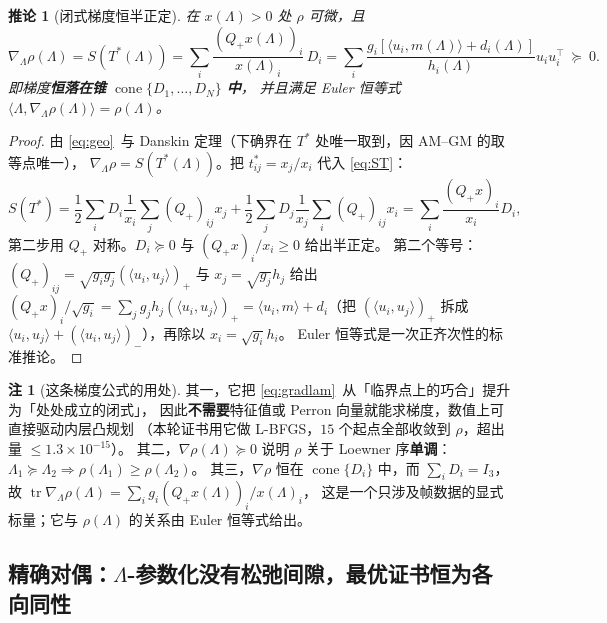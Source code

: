 \documentclass[UTF8,11pt]{ctexart}
\newtheorem{corollary}[theorem]{推论}
\theoremstyle{definition}
\newtheorem{remark}[theorem]{注}
\newcommand{\Lam}{\Lambda}
\newcommand{\tr}{\operatorname{tr}}
\begin{document}
\begin{corollary}[闭式梯度恒半正定]\label{cor:gradpsi}
在 $x(\Lam)>0$ 处 $\rho$ 可微，且
\begin{equation}\label{eq:gradpsi}
\nabla_\Lam\rho(\Lam)=S(T^*(\Lam))=\sum_i\frac{(Q_+x(\Lam))_i}{x(\Lam)_i}\,D_i
=\sum_i\frac{g_i[\langle u_i,m(\Lam)\rangle+d_i(\Lam)]}{h_i(\Lam)}u_iu_i^\top\ \succeq\ 0 .
\end{equation}
即梯度\textbf{恒落在锥} $\operatorname{cone}\{D_1,\dots,D_N\}$ \textbf{中}，
并且满足 Euler 恒等式 $\langle\Lam,\nabla_\Lam\rho(\Lam)\rangle=\rho(\Lam)$。
\end{corollary}

\begin{proof}
由 \eqref{eq:geo}~与 Danskin 定理（下确界在 $T^*$ 处唯一取到，因 AM--GM 的取等点唯一），
$\nabla_\Lam\rho=S(T^*(\Lam))$。把 $t^*_{ij}=x_j/x_i$ 代入 \eqref{eq:ST}：
\[
S(T^*)=\frac12\sum_i D_i\frac1{x_i}\sum_j(Q_+)_{ij}x_j+\frac12\sum_j D_j\frac1{x_j}\sum_i(Q_+)_{ij}x_i
=\sum_i\frac{(Q_+x)_i}{x_i}D_i ,
\]
第二步用 $Q_+$ 对称。$D_i\succeq0$ 与 $(Q_+x)_i/x_i\ge0$ 给出半正定。
第二个等号：$(Q_+)_{ij}=\sqrt{g_ig_j}(\langle u_i,u_j\rangle)_+$ 与 $x_j=\sqrt{g_j}h_j$ 给出
$(Q_+x)_i/\sqrt{g_i}=\sum_jg_jh_j(\langle u_i,u_j\rangle)_+
=\langle u_i,m\rangle+d_i$（把 $(\langle u_i,u_j\rangle)_+$ 拆成
$\langle u_i,u_j\rangle+(\langle u_i,u_j\rangle)_-$），再除以 $x_i=\sqrt{g_i}h_i$。
Euler 恒等式是一次正齐次性的标准推论。
\end{proof}

\begin{remark}[这条梯度公式的用处]\label{rmk:gradpsi}
其一，它把 \eqref{eq:gradlam}~从「临界点上的巧合」提升为「处处成立的闭式」，
因此\textbf{不需要}特征值或 Perron 向量就能求梯度，数值上可直接驱动内层凸规划
（本轮证书用它做 L-BFGS，$15$ 个起点全部收敛到 $\rho$，超出量 $\le1.3\times10^{-15}$）。
其二，$\nabla\rho(\Lam)\succeq0$ 说明 $\rho$ 关于 Loewner 序\textbf{单调}：
$\Lam_1\succeq\Lam_2\Rightarrow\rho(\Lam_1)\ge\rho(\Lam_2)$。
其三，$\nabla\rho$ 恒在 $\operatorname{cone}\{D_i\}$ 中，而 $\sum_iD_i=I_3$，
故 $\tr\nabla_\Lam\rho(\Lam)=\sum_ig_i(Q_+x(\Lam))_i/x(\Lam)_i$，
这是一个只涉及帧数据的显式标量；它与 $\rho(\Lam)$ 的关系由 Euler 恒等式给出。
\end{remark}

\subsection{精确对偶：$\Lam$-参数化没有松弛间隙，最优证书恒为各向同性}\label{sec:r19:dual}
\end{document}
